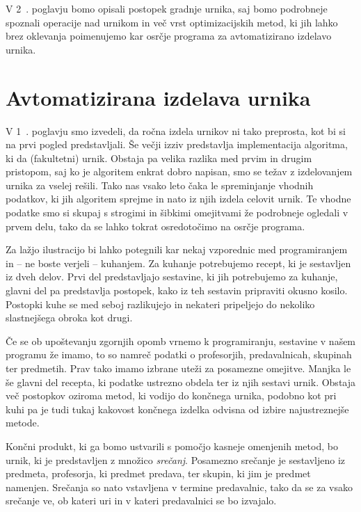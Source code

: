 \documentclass[a4paper, 10pt]{article}
\begin{document}
V 2~. poglavju bomo opisali postopek gradnje urnika, saj bomo podrobneje spoznali
operacije nad urnikom in več vrst optimizacijskih metod, ki jih lahko brez oklevanja
poimenujemo kar osrčje programa za avtomatizirano izdelavo urnika.

\section[short]{Avtomatizirana izdelava urnika} %

V 1~. poglavju smo izvedeli, da ročna izdela urnikov ni tako preprosta, kot bi si
na prvi pogled predstavljali. Še večji izziv predstavlja implementacija algoritma, ki da
(fakultetni) urnik. Obstaja pa velika razlika med prvim in drugim pristopom, saj ko je
algoritem enkrat dobro napisan, smo se težav z izdelovanjem urnika za vselej rešili.
Tako nas vsako leto čaka le spreminjanje vhodnih podatkov, ki jih algoritem sprejme in
nato iz njih izdela celovit urnik. Te vhodne podatke smo si skupaj s strogimi in šibkimi
omejitvami že podrobneje ogledali v prvem delu, tako da se lahko tokrat osredotočimo na
osrčje programa.

Za lažjo ilustracijo bi lahko potegnili kar nekaj vzporednic med programiranjem in -- ne
boste verjeli -- kuhanjem. Za kuhanje potrebujemo recept, ki je sestavljen iz dveh delov.
Prvi del predstavljajo sestavine, ki jih potrebujemo za kuhanje, glavni del pa predstavlja
postopek, kako iz teh sestavin pripraviti okusno kosilo. Postopki kuhe se med seboj
razlikujejo in nekateri pripeljejo do nekoliko slastnejšega obroka kot drugi.

Če se ob upoštevanju zgornjih opomb vrnemo k programiranju, sestavine v našem programu že
imamo, to so namreč podatki o profesorjih, predavalnicah, skupinah ter predmetih. Prav tako
imamo izbrane uteži za posamezne omejitve. Manjka le še glavni del recepta, ki podatke
ustrezno obdela ter iz njih sestavi urnik. Obstaja več postopkov oziroma metod, ki vodijo
do končnega urnika, podobno kot pri kuhi pa je tudi tukaj kakovost končnega izdelka odvisna
od izbire najustreznejše metode.

Končni produkt, ki ga bomo ustvarili s pomočjo kasneje omenjenih metod, bo urnik, ki je
predstavljen z množico \emph{srečanj}. Posamezno srečanje je sestavljeno iz predmeta,
profesorja, ki predmet predava, ter skupin, ki jim je predmet namenjen. Srečanja so nato
vstavljena v termine predavalnic, tako da se za vsako srečanje ve, ob kateri uri in v
kateri predavalnici se bo izvajalo.
\end{document}
